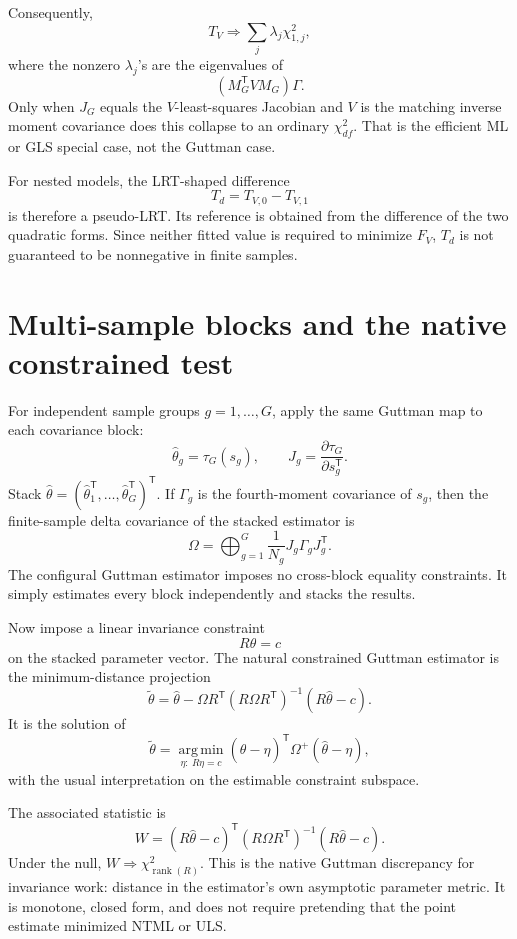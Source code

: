 \documentclass[11pt]{article}
\newcommand{\T}{^{\mathsf T}}
\newcommand{\rank}{\operatorname{rank}}
\newcommand{\argmin}{\operatorname*{arg\,min}}
\theoremstyle{plain}
\theoremstyle{remark}
\begin{document}
Consequently,
\begin{equation}\label{eq:mixture}
  T_V
  \Rightarrow
  \sum_j \lambda_j \chi^2_{1,j},
\end{equation}
where the nonzero \(\lambda_j\)'s are the eigenvalues of
\[
  (M_G\T V M_G)\Gamma .
\]
Only when \(J_G\) equals the \(V\)-least-squares Jacobian and \(V\) is the
matching inverse moment covariance does this collapse to an ordinary
\(\chi^2_{df}\). That is the efficient ML or GLS special case, not the Guttman
case.

For nested models, the LRT-shaped difference
\[
  T_d=T_{V,0}-T_{V,1}
\]
is therefore a pseudo-LRT. Its reference is obtained from the difference of the
two quadratic forms. Since neither fitted value is required to minimize
\(F_V\), \(T_d\) is not guaranteed to be nonnegative in finite samples.

\section{Multi-sample blocks and the native constrained test}

For independent sample groups \(g=1,\ldots,G\), apply the same Guttman map to
each covariance block:
\[
  \hat\theta_g=\tau_G(s_g),
  \qquad
  J_g=\frac{\partial\tau_G}{\partial s_g\T}.
\]
Stack \(\hat\theta=(\hat\theta_1\T,\ldots,\hat\theta_G\T)\T\). If
\(\Gamma_g\) is the fourth-moment covariance of \(s_g\), then the finite-sample
delta covariance of the stacked estimator is
\begin{equation}\label{eq:Omega-block}
  \Omega
  =
  \bigoplus_{g=1}^G
  \frac{1}{N_g}J_g\Gamma_gJ_g\T .
\end{equation}
The configural Guttman estimator imposes no cross-block equality constraints.
It simply estimates every block independently and stacks the results.

Now impose a linear invariance constraint
\[
  R\theta=c
\]
on the stacked parameter vector. The natural constrained Guttman estimator is
the minimum-distance projection
\begin{equation}\label{eq:projection}
  \tilde\theta
  =
  \hat\theta
  -
  \Omega R\T(R\Omega R\T)^{-1}(R\hat\theta-c).
\end{equation}
It is the solution of
\[
  \tilde\theta
  =
  \argmin_{\eta:\ R\eta=c}
  (\hat\theta-\eta)\T\Omega^{+}(\hat\theta-\eta),
\]
with the usual interpretation on the estimable constraint subspace.

The associated statistic is
\begin{equation}\label{eq:wald}
  W
  =
  (R\hat\theta-c)\T
  (R\Omega R\T)^{-1}
  (R\hat\theta-c).
\end{equation}
Under the null, \(W\Rightarrow\chi^2_{\rank(R)}\). This is the native
Guttman discrepancy for invariance work: distance in the estimator's own
asymptotic parameter metric. It is monotone, closed form, and does not require
pretending that the point estimate minimized NTML or ULS.
\end{document}

